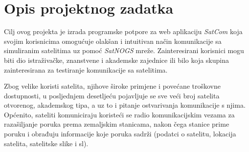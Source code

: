 \chapter{Opis projektnog zadatka}
		
		
        {   Cilj ovog projekta je izrada programske potpore za web aplikaciju \textit{SatCom} koja svojim korisnicima omogućuje olakšan i intuitivan način komunikacije sa simuliranim satelitima uz pomoć \textit{SatNOGS} mreže. Zainteresirani korisnici mogu biti dio istraživačke, znanstvene i akademske zajednice ili bilo koja skupina zainteresirana za testiranje komunikacije sa satelitima.} \par
        {   Zbog velike koristi satelita, njihove široke primjene i povećane troškovne dostupnosti, u posljednjem desetljeću pojavljuje se sve veći broj satelita otvorenog, akademskog tipa, a uz to i pitanje ostvarivanja komunikacije s njima. Općenito, sateliti komuniciraju koristeći se radio komunikacijskim vezama za razašiljanje poruka prema zemaljskim stanicama, nakon čega stanice prime poruku i obrađuju informacije koje poruka sadrži (podatci o satelitu, lokacija satelita, satelitske slike i sl).} \par
